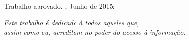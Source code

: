 \documentclass[
	12pt,				%
	openright,			%
	twoside,			%
	a4paper,			%
	english,			%
	french,				%
	spanish,			%
	brazil				%
	]{abntex2}
\begin{document}


%
% 
%
\begin{folhadeaprovacao}

  \begin{center}
    {\ABNTEXchapterfont\large\imprimirautor}

    \vspace*{\fill}\vspace*{\fill}
    \begin{center}
      \ABNTEXchapterfont\bfseries\Large\imprimirtitulo
    \end{center}
    \vspace*{\fill}
    
    \hspace{.45\textwidth}
    \begin{minipage}{.5\textwidth}
        \imprimirpreambulo
    \end{minipage}%
    \vspace*{\fill}
   \end{center}
        
   Trabalho aprovado. \imprimirlocal, Junho de 2015:

      
   \begin{center}
    \vspace*{0.5cm}
    {\large\imprimirlocal}
    \par
    {\large\imprimirdata}
    \vspace*{1cm}
  \end{center}
  
\end{folhadeaprovacao}

\begin{dedicatoria}
   \vspace*{\fill}
   \centering
   \noindent
   \textit{ Este trabalho é dedicado à todos aqueles que,\\
   assim como eu, acreditam no poder do acesso à informação.} \vspace*{\fill}
\end{dedicatoria}
\end{document}
